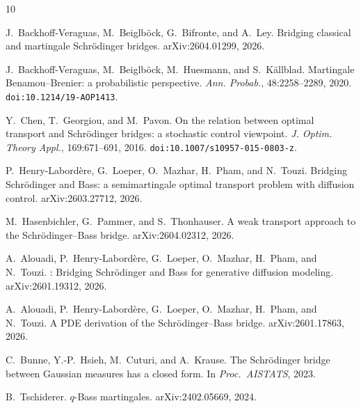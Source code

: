 \documentclass[12pt]{article}
\theoremstyle{definition}
\begin{document}
\begin{thebibliography}{10}

J.~Backhoff-Veraguas, M.~Beiglb\"ock, G.~Bifronte, and A.~Ley.
\newblock Bridging classical and martingale {S}chr\"odinger bridges.
\newblock arXiv:2604.01299, 2026.

J.~Backhoff-Veraguas, M.~Beiglb\"ock, M.~Huesmann, and S.~K\"allblad.
\newblock Martingale {B}enamou--{B}renier: a probabilistic perspective.
\newblock \emph{Ann. Probab.}, 48:2258--2289, 2020.
\newblock \texttt{doi:10.1214/19-AOP1413}.

Y.~Chen, T.~Georgiou, and M.~Pavon.
\newblock On the relation between optimal transport and {S}chr\"odinger bridges:
  a stochastic control viewpoint.
\newblock \emph{J. Optim. Theory Appl.}, 169:671--691, 2016.
\newblock \texttt{doi:10.1007/s10957-015-0803-z}.

P.~Henry-Labord\`ere, G.~Loeper, O.~Mazhar, H.~Pham, and N.~Touzi.
\newblock Bridging {S}chr\"odinger and {B}ass: a semimartingale optimal
  transport problem with diffusion control.
\newblock arXiv:2603.27712, 2026.

M.~Hasenbichler, G.~Pammer, and S.~Thonhauser.
\newblock A weak transport approach to the {S}chr\"odinger--{B}ass bridge.
\newblock arXiv:2604.02312, 2026.

A.~Alouadi, P.~Henry-Labord\`ere, G.~Loeper, O.~Mazhar, H.~Pham, and
  N.~Touzi.
: Bridging {S}chr\"odinger and {B}ass for generative
  diffusion modeling.
\newblock arXiv:2601.19312, 2026.

A.~Alouadi, P.~Henry-Labord\`ere, G.~Loeper, O.~Mazhar, H.~Pham, and
  N.~Touzi.
\newblock A {PDE} derivation of the {S}chr\"odinger--{B}ass bridge.
\newblock arXiv:2601.17863, 2026.

C.~Bunne, Y.-P.~Hsieh, M.~Cuturi, and A.~Krause.
\newblock The {S}chr\"odinger bridge between {G}aussian measures has a closed form.
\newblock In \emph{Proc.\ AISTATS}, 2023.

B.~Tschiderer.
\newblock $q$-{B}ass martingales.
\newblock arXiv:2402.05669, 2024.

\end{thebibliography}
\end{document}
